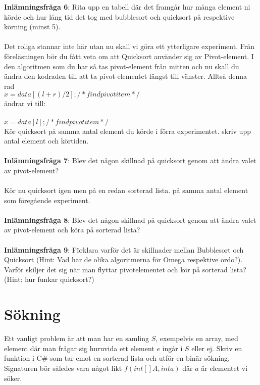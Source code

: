 \documentclass{article}
\begin{document}
\textbf{Inlämningsfråga 6}: Rita upp en tabell där det framgår hur många element ni körde och hur lång tid det tog med bubblesort och quicksort på respektive körning (minst 5). \\\\

Det roliga stannar inte här utan nu skall vi göra ett ytterligare experiment. Från föreläsningen bör du fått veta om att Quicksort använder sig av Pivot-element. I den algoritmen som du har så tas pivot-element från mitten och nu skall du ändra den kodraden till att ta pivot-elementet längst till vänster. Alltså denna rad\\

$x = data[(l + r) / 2]; /* find pivot item */$ \\

ändrar vi till: \\\\
$x = data[l]; /* find pivot item */$ \\

Kör quicksort på samma antal element du körde i förra experimentet. skriv upp antal element och körtiden. \\\\

\textbf{Inlämningsfråga 7}: Blev det någon skillnad på quicksort genom att ändra valet av pivot-element?  \\\\

Kör nu quicksort igen men på en redan sorterad lista. på samma antal element som föregående experiment. \\\\

\textbf{Inlämningsfråga 8}: Blev det någon skillnad på quicksort genom att ändra valet av pivot-element och köra på sorterad lista?  \\\\

\textbf{Inlämningsfråga 9}: Förklara varför det är skillnader mellan Bubblesort och Quicksort (Hint: Vad har de olika algoritmerna för Omega respektive ordo?). Varför skiljer det sig när man flyttar pivotelementet och kör på sorterad lista? (Hint: hur funkar quicksort?)


\section*{Sökning}
Ett vanligt problem är att man har en samling $S$, exempelvis en array, med element där man frågar sig huruvida ett element $e$ ingår i $S$ eller ej. Skriv en funktion i C\# som tar emot en sorterad lista och utför en binär sökning. Signaturen bör således vara något likt $f(int[ ] A, int a) $ där $a$ är elementet vi söker.
\end{document}
